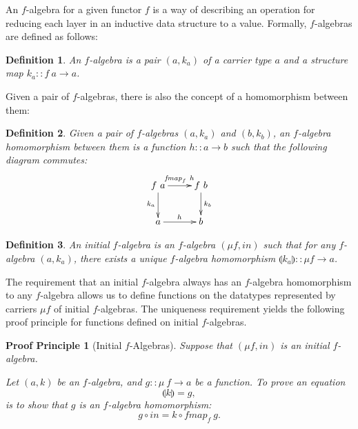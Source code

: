 \documentclass{jfp1}
\newcommand{\fold}[1]{\llparenthesis #1 \rrparenthesis}
\newtheorem{definition}{Definition}
\newtheorem{proofprinciple}{Proof Principle}
\begin{document}
An $f$-algebra for a given functor $f$ is a way of describing an
operation for reducing each layer in an inductive data structure to a
value. Formally, $f$-algebras are defined as follows:
\begin{definition}
  An \emph{$f$-algebra} is a pair $(a, k_a)$ of a
  \emph{carrier type} $a$ and a \emph{structure map}
  $k_a :: f~a \to a$.
\end{definition}
Given a pair of $f$-algebras, there is also the concept of a
homomorphism between them:
\begin{definition}
  Given a pair of $f$-algebras $(a,k_a)$ and $(b, k_b)$, an
  \emph{$f$-algebra homomorphism} between them is a function $h :: a
  \to b$ such that the following diagram commutes:
  \begin{equation}
    \label{eq:falgebra-homomorphism}
    \xymatrix{
      {f~a} \ar[r]^{\mathit{fmap}_f~h} \ar[d]_{k_a}
      &
      {f~b} \ar[d]^{k_b}
      \\
      {a} \ar[r]^h
      &
      {b}
    }
  \end{equation}


\end{definition}

\begin{definition}
  An \emph{initial $f$-algebra} is an $f$-algebra $(\mu f,
  \mathit{in})$ such that for any $f$-algebra $(a, k_a)$, there exists
  a unique $f$-algebra homomorphism $\fold{k_a} :: \mu f \to a$.
\end{definition}

The requirement that an initial $f$-algebra always has an $f$-algebra
homomorphism to any $f$-algebra allows us to define functions on the
datatypes represented by carriers $\mu f$ of initial $f$-algebras. The
uniqueness requirement yields the following proof principle for
functions defined on initial $f$-algebras.

\begin{proofprinciple}[Initial $f$-Algebras]\label{pp:initial-alg}
  Suppose that $(\mu f, \mathit{in})$ is an initial $f$-algebra.

  Let $(a, k)$ be an $f$-algebra, and $g :: \mu~f \to
  a$ be a function. To prove an equation
  \begin{displaymath}
    \fold{k} = g,
  \end{displaymath}
  is to show that $g$ is an $f$-algebra homomorphism:
  \begin{displaymath}
    g \circ \mathit{in} = k \circ \mathit{fmap}_f~g.
  \end{displaymath}
\end{proofprinciple}
\end{document}
